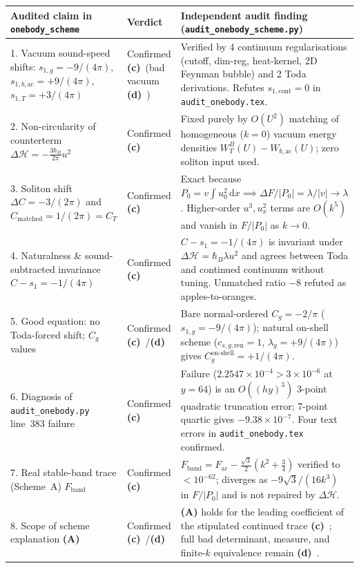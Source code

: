 \documentclass[11pt,a4paper]{article}
\newcommand{\Lc}{\textbf{(c)}\ }
\newcommand{\Ld}{\textbf{(d)}\ }
\newcommand{\dd}{\mathrm d}
\newcommand{\scr}{\texttt{audit\_\allowbreak onebody\_\allowbreak scheme.py}}
\begin{document}
\begin{longtable}{@{}L{4.8cm}L{2.3cm}L{7.8cm}@{}}
\toprule
Audited claim in \texttt{onebody\_scheme} & Verdict & Independent audit finding (\scr) \\
\midrule{}. Vacuum sound-speed shifts: $s_{1,g} = -9/(4\pi)$, $s_{1,b,\mathrm{ac}} = +9/(4\pi)$, $s_{1,T} = +3/(4\pi)$ & Confirmed \Lc (bad vacuum \Ld) & Verified by 4 continuum regularisations (cutoff, dim-reg, heat-kernel, 2D Feynman bubble) and 2 Toda derivations. Refutes $s_{1,\mathrm{cont}}=0$ in \texttt{audit\_\allowbreak onebody.tex}. \\
2. Non-circularity of counterterm $\Delta\mathcal{H} = -\frac{3\hbar_B}{2\pi}u^2$ & Confirmed \Lc & Fixed purely by $O(U^2)$ matching of homogeneous ($k=0$) vacuum energy densities $W_T^B(U) - W_{b,\mathrm{ac}}(U)$; zero soliton input used. \\
3. Soliton shift $\Delta C = -3/(2\pi)$ and $C_{\mathrm{matched}} = 1/(2\pi) = C_T$ & Confirmed \Lc & Exact because $P_0 = v\int u_0^2\,\dd x \implies \Delta F/|P_0| = \lambda/|v| \to \lambda$. Higher-order $u^3, u_x^2$ terms are $O(k^5)$ and vanish in $F/|P_0|$ as $k\to 0$. \\
4. Naturalness \& sound-subtracted invariance $C - s_1 = -1/(4\pi)$ & Confirmed \Lc & $C - s_1 = -1/(4\pi)$ is invariant under $\Delta\mathcal{H}=\hbar_B\lambda u^2$ and agrees between Toda and continued continuum without tuning. Unmatched ratio $-8$ refuted as apples-to-oranges. \\
5. Good equation: no Toda-forced shift; $C_g$ values & Confirmed \Lc/\Ld & Bare normal-ordered $C_g = -2/\pi$ ($s_{1,g} = -9/(4\pi)$); natural on-shell scheme ($c_{s,g,\mathrm{ren}}=1$, $\lambda_g=+9/(4\pi)$) gives $C_g^{\mathrm{on\text{-}shell}} = +1/(4\pi)$. \\
6. Diagnosis of \texttt{audit\_\allowbreak onebody.py} line~383 failure & Confirmed \Lc & Failure ($2.2547\times 10^{-4} > 3\times 10^{-6}$ at $y=64$) is an $O((hy)^3)$ 3-point quadratic truncation error; 7-point quartic gives $-9.38\times 10^{-7}$. Four text errors in \texttt{audit\_\allowbreak onebody.tex} confirmed. \\
7. Real stable-band trace (Scheme~A) $F_{\mathrm{band}}$ & Confirmed \Lc & $F_{\mathrm{band}} = F_{\mathrm{ac}} - \frac{\sqrt{3}}{2}(k^2+\frac{3}{4})$ verified to $<10^{-62}$; diverges as $-9\sqrt{3}/(16k^3)$ in $F/|P_0|$ and is not repaired by $\Delta\mathcal{H}$. \\
8. Scope of scheme explanation \textbf{(A)} & Confirmed \Lc/\Ld & \textbf{(A)} holds for the leading coefficient of the stipulated continued trace \Lc; full bad determinant, measure, and finite-$k$ equivalence remain \Ld. \\
\bottomrule
\end{longtable}
\end{document}
